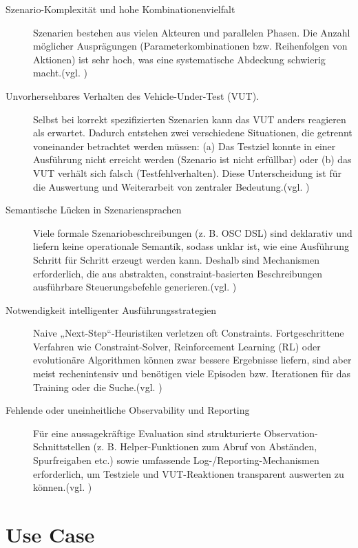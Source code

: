 \begin{description}
    \item[Szenario-Komplexität und hohe Kombinationenvielfalt] Szenarien bestehen aus vielen Akteuren und parallelen Phasen. Die Anzahl möglicher Ausprägungen (Parameterkombinationen bzw. Reihenfolgen von Aktionen) ist sehr hoch, was eine systematische Abdeckung schwierig macht.(vgl. \cite{EinfuehrungIntegrationsprojekt})
    \item[Unvorhersehbares Verhalten des Vehicle-Under-Test (VUT).] Selbst bei korrekt spezifizierten Szenarien kann das VUT anders reagieren als erwartet. Dadurch entstehen zwei verschiedene Situationen, die getrennt voneinander betrachtet werden müssen: (a) Das Testziel konnte in einer Ausführung nicht erreicht werden (Szenario ist nicht erfüllbar) oder (b) das VUT verhält sich falsch (Testfehlverhalten). Diese Unterscheidung ist für die Auswertung und Weiterarbeit von zentraler Bedeutung.(vgl. \cite{EinfuehrungIntegrationsprojekt})
    \item[Semantische Lücken in Szenariensprachen] Viele formale Szenariobeschreibungen (z. B. OSC DSL) sind deklarativ und liefern keine operationale Semantik, sodass unklar ist, wie eine Ausführung Schritt für Schritt erzeugt werden kann. Deshalb sind Mechanismen erforderlich, die aus abstrakten, constraint-basierten Beschreibungen ausführbare Steuerungsbefehle generieren.(vgl. \cite{EinfuehrungIntegrationsprojekt})
    \item[Notwendigkeit intelligenter Ausführungsstrategien] Naive „Next-Step“-Heuristiken verletzen oft Constraints. Fortgeschrittene Verfahren wie Constraint-Solver, Reinforcement Learning (RL) oder evolutionäre Algorithmen können zwar bessere Ergebnisse liefern, sind aber meist rechenintensiv und benötigen viele Episoden bzw. Iterationen für das Training oder die Suche.(vgl. \cite{EinfuehrungIntegrationsprojekt})
    \item[Fehlende oder uneinheitliche Observability und Reporting] Für eine aussagekräftige Evaluation sind strukturierte Observation-Schnittstellen (z. B. Helper-Funktionen zum Abruf von Abständen, Spurfreigaben etc.) sowie umfassende Log-/Reporting-Mechanismen erforderlich, um Testziele und VUT-Reaktionen transparent auswerten zu können.(vgl. \cite{EinfuehrungIntegrationsprojekt})
\end{description}

\section{Use Case}

